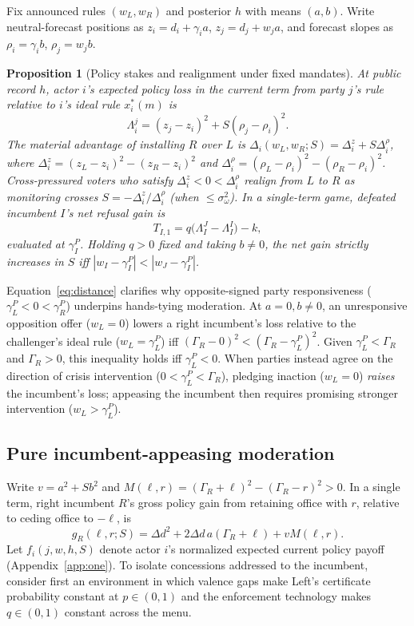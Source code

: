 \documentclass[11pt,letterpaper]{article}
\newtheorem{proposition}{Proposition}
\newcommand{\Dd}{\Delta d}
\begin{document}
Fix announced rules $(w_L,w_R)$ and posterior $h$ with means $(a,b)$. Write neutral-forecast positions as $z_i=d_i+\gamma_i a$, $z_j=d_j+w_j a$, and forecast slopes as $\rho_i=\gamma_i b$, $\rho_j=w_j b$.

\begin{proposition}[Policy stakes and realignment under fixed mandates]\label{prop:fixed}
At public record $h$, actor $i$'s expected policy loss in the current term from party $j$'s rule relative to $i$'s ideal rule $x_i^*(m)$ is
\begin{equation}
 \Lambda_i^j=(z_j-z_i)^2+S(\rho_j-\rho_i)^2.
 \label{eq:distance}
\end{equation}
The material advantage of installing $R$ over $L$ is $\Delta_i(w_L,w_R;S)=\Delta_i^z+S\Delta_i^\rho$, where $\Delta_i^z=(z_L-z_i)^2-(z_R-z_i)^2$ and $\Delta_i^\rho=(\rho_L-\rho_i)^2-(\rho_R-\rho_i)^2$. Cross-pressured voters who satisfy $\Delta_i^z<0<\Delta_i^\rho$ realign from $L$ to $R$ as monitoring crosses $S=-\Delta_i^z/\Delta_i^\rho$ (when $\le\sigma_\omega^2$). In a single-term game, defeated incumbent $I$'s net refusal gain is
\begin{equation}
 T_{I,1}=q\big(\Lambda_I^J-\Lambda_I^I\big)-k ,
 \label{eq:termgain}
\end{equation}
evaluated at $\gamma_I^P$. Holding $q>0$ fixed and taking $b\ne 0$, the net gain strictly increases in $S$ iff $|w_I-\gamma_I^P|<|w_J-\gamma_I^P|$.
\end{proposition}

Equation~\eqref{eq:distance} clarifies why opposite-signed party responsiveness ($\gamma_L^P<0<\gamma_R^P$) underpins hands-tying moderation. At $a=0,b\ne 0$, an unresponsive opposition offer ($w_L=0$) lowers a right incumbent's loss relative to the challenger's ideal rule ($w_L=\gamma_L^P$) iff $(\Gamma_R-0)^2<(\Gamma_R-\gamma_L^P)^2$. Given $\gamma_L^P<\Gamma_R$ and $\Gamma_R>0$, this inequality holds iff $\gamma_L^P<0$. When parties instead agree on the direction of crisis intervention ($0<\gamma_L^P<\Gamma_R$), pledging inaction ($w_L=0$) \emph{raises} the incumbent's loss; appeasing the incumbent then requires promising stronger intervention ($w_L>\gamma_L^P$).

\subsection{Pure incumbent-appeasing moderation}

Write $v=a^2+Sb^2$ and $M(\ell,r)=(\Gamma_R+\ell)^2-(\Gamma_R-r)^2>0$. In a single term, right incumbent $R$'s gross policy gain from retaining office with $r$, relative to ceding office to $-\ell$, is
\begin{equation}
 g_R(\ell,r;S)=\Dd^2+2\Dd\,a(\Gamma_R+\ell)+v M(\ell,r).
 \label{eq:g-symbolic}
\end{equation}
Let $f_i(j,w,h,S)$ denote actor $i$'s normalized expected current policy payoff (Appendix~\ref{app:one}). To isolate concessions addressed to the incumbent, consider first an environment in which valence gaps make Left's certificate probability constant at $p\in(0,1)$ and the enforcement technology makes $q\in(0,1)$ constant across the menu.
\end{document}
